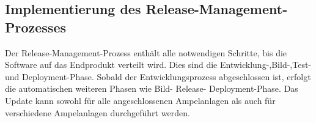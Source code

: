 \subsection{Implementierung des Release-Management-Prozesses}

Der Release-Management-Prozess enthält alle notwendigen Schritte, bis die Software auf das Endprodukt verteilt wird. Dies sind die Entwicklung-,Bild-,Test- und Deployment-Phase. Sobald der Entwicklungsprozess abgeschlossen ist, erfolgt die automatischen weiteren Phasen wie Bild- Release- Deployment-Phase. Das Update kann sowohl für alle angeschlossenen Ampelanlagen als auch für verschiedene Ampelanlagen durchgeführt werden.
